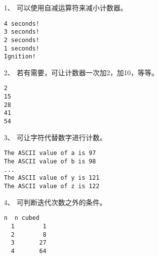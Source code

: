 \begin{frame}[fragile]
1、 可以使用自减运算符来减小计数器。

\end{frame}

\begin{frame}[fragile]
\begin{lstlisting}[backgroundcolor=\color{red!10}]
4 seconds!
3 seconds!
2 seconds!
1 seconds!
Ignition!
\end{lstlisting}
\end{frame}

\begin{frame}[fragile]
2、 若有需要，可让计数器一次加2，加10，等等。

\end{frame}

\begin{frame}[fragile]

\begin{lstlisting}[backgroundcolor=\color{red!10}]
2
15
28
41
54
\end{lstlisting}
\end{frame}

\begin{frame}[fragile]
3、 可让字符代替数字进行计数。

\end{frame}

\begin{frame}[fragile]
\begin{lstlisting}[backgroundcolor=\color{red!10}]
The ASCII value of a is 97
The ASCII value of b is 98
... 
The ASCII value of y is 121
The ASCII value of z is 122
\end{lstlisting}
\end{frame}

\begin{frame}[fragile]
4、 可判断迭代次数之外的条件。

\end{frame}

\begin{frame}[fragile]
\begin{lstlisting}[backgroundcolor=\color{red!10}]
  n  n cubed
  1        1
  2        8
  3       27
  4       64
\end{lstlisting}
\end{frame}

